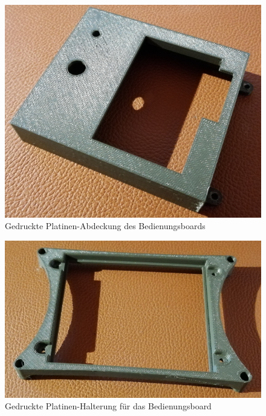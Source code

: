 \begin{minipage}[b]{0.46\textwidth}
\centering
\begin{figure}[H] %
\includegraphics[width=.9\textwidth]{sec2/images/3DAnbaukomponenten/Druckbilder/DisplayAbdeckungDruck} 
\centering
\captionsetup{width=.95\textwidth}
\caption[Gedruckte Platinen-Abdeckung des Bedienungsboards]{Gedruckte Platinen-Abdeckung des Bedienungsboards}\centering
\label{fig:DisplayAbdeckungDruck}
\end{figure}
\end{minipage}
\begin{minipage}[b]{0.46\textwidth}
\begin{figure}[H] %
\includegraphics[width=.9\textwidth]{sec2/images/3DAnbaukomponenten/Druckbilder/PlatinenHalterungDruck} 
\centering
\captionsetup{width=.95\textwidth}
\caption[Gedruckte Platinen-Halterung für das Bedienungsboard]{Gedruckte Platinen-Halterung für das Bedienungsboard}\centering
\label{fig:PlatinenHalterungDruck}
\end{figure}
\end{minipage}
\vspace{4mm}

